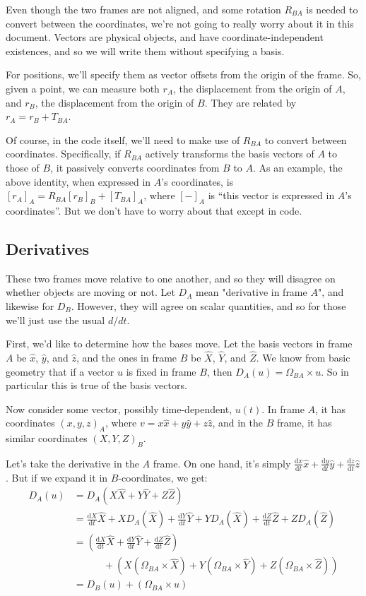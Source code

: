 \documentclass{article}
\newcommand{\dd}{\mathrm{d}}
\newcommand{\der}[2]{\frac{\dd #1}{\dd #2}}
\numberwithin{equation}{subsection}
\begin{document}
Even though the two frames are not aligned, and some rotation $R_{BA}$ is needed to convert between the coordinates, we're not going to really worry about it in this document. Vectors are physical objects, and have coordinate-independent existences, and so we will write them without specifying a basis.

For positions, we'll specify them as vector offsets from the origin of the frame. So, given a point, we can measure both $r_A$, the displacement from the origin of $A$, and $r_B$, the displacement from the origin of $B$. They are related by $r_A = r_B + T_{BA}$.

Of course, in the code itself, we'll need to make use of $R_{BA}$ to convert between coordinates. Specifically, if $R_{BA}$ actively transforms the basis vectors of $A$ to those of $B$, it passively converts coordinates from $B$ to $A$. As an example, the above identity, when expressed in $A$'s coordinates, is $[r_A]_A = R_{BA} [r_B]_B + [T_{BA}]_A$, where $[-]_A$ is ``this vector is expressed in $A$'s coordinates''. But we don't have to worry about that except in code.

\subsection{Derivatives}

These two frames move relative to one another, and so they will disagree on whether objects are moving or not. Let $D_A$ mean "derivative in frame $A$", and likewise for $D_B$. However, they will agree on scalar quantities, and so for those we'll just use the usual $d/dt$.

First, we'd like to determine how the bases move. Let the basis vectors in frame $A$ be $\hat x$, $\hat y$, and $\hat z$, and the ones in frame $B$ be $\hat X$, $\hat Y$, and $\hat Z$. We know from basic geometry that if a vector $u$ is fixed in frame $B$, then $D_A (u) = \Omega_{BA} \times u$. So in particular this is true of the basis vectors.

Now consider some vector, possibly time-dependent, $u(t)$. In frame $A$, it has coordinates $(x, y, z)_A$, where $v = x \hat x + y \hat y + z \hat z$, and in the $B$ frame, it has similar coordinates $(X, Y, Z)_B$.

Let's take the derivative in the $A$ frame. On one hand, it's simply $\der{x}{t} \hat x + \der{y}{t} \hat y + \der{z}{t} \hat z$. But if we expand it in $B$-coordinates, we get:
\begin{align*}
D_A (u) &= D_A (X \hat X + Y \hat Y + Z \hat Z) \\
&= \der{X}{t} \hat X + X D_A (\hat X) + \der{Y}{t} \hat Y + Y D_A (\hat X) + \der{Z}{t} \hat Z + Z D_A (\hat Z) \\
&= \left( \der{X}{t} \hat X + \der{Y}{t} \hat Y + \der{Z}{t} \hat Z \right) \\
&\qquad\quad + \left( X (\Omega_{BA} \times \hat X) + Y (\Omega_{BA} \times \hat Y) + Z (\Omega_{BA} \times \hat Z) \right) \\
&= D_B (u) + (\Omega_{BA} \times u)
\end{align*}
\end{document}
